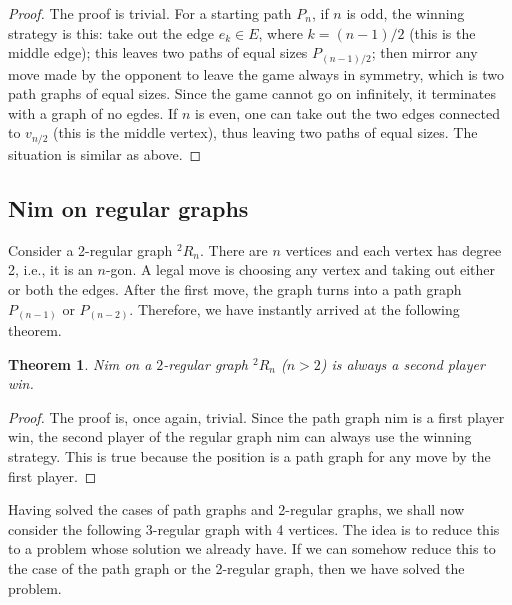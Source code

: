 \documentclass[a4paper, 12pt]{article}
\newtheorem{theorem}{Theorem}[section] %
\theoremstyle{remark} %
\begin{document}
\begin{proof}
	The proof is trivial. For a starting path $P_n$, if $n$ is odd, the winning strategy is this: take out the edge $e_k \in E$, where $k = (n-1)/2$ (this is the middle edge); this leaves two paths of equal sizes $P_{(n-1)/2}$; then mirror any move made by the opponent to leave the game always in symmetry, which is two path graphs of equal sizes. Since the game cannot go on infinitely, it terminates with a graph of no egdes. If $n$ is even, one can take out the two edges connected to $v_{n/2}$ (this is the middle vertex), thus leaving two paths of equal sizes. The situation is similar as above.
\end{proof}

\subsection{Nim on regular graphs}

Consider a 2-regular graph $^2 R_n$. There are $n$ vertices and each vertex has degree 2, i.e., it is an $n$-gon. A legal move is choosing any vertex and taking out either or both the edges. After the first move, the graph turns into a path graph $P_{(n-1)}$ or $P_{(n-2)}$. Therefore, we have instantly arrived at the following theorem.

\begin{theorem}
	\label{regularGraphTheorem}
	Nim on a $2$-regular graph $^2 R_n$ ($n>2$) is always a second player win.
\end{theorem}

\begin{proof}
	The proof is, once again, trivial. Since the path graph nim is a first player win, the second player of the regular graph nim can always use the winning strategy. This is true because the position is a path graph for any move by the first player.
\end{proof}

Having solved the cases of path graphs and 2-regular graphs, we shall now consider the following 3-regular graph with 4 vertices. The idea is to reduce this to a problem whose solution we already have. If we can somehow reduce this to the case of the path graph or the 2-regular graph, then we have solved the problem.\\

\begin{center}
\end{center}
\end{document}
